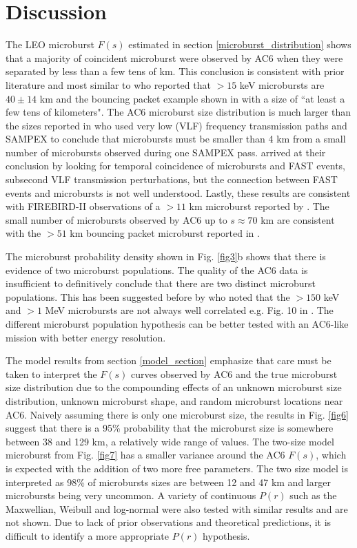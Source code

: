 \documentclass[draft]{agujournal2019}
\begin{document}
\section{Discussion}
The LEO microburst $F(s)$ estimated in section \ref{microburst_distribution} shows that a majority of coincident microburst were observed by AC6 when they were separated by less than a few tens of km. This conclusion is consistent with prior literature and most similar to  who reported that $> 15$ keV microbursts are $40 \pm 14$ km and the bouncing packet example shown in  with a size of ``at least a few tens of kilometers". The AC6 microburst size distribution is much larger than the sizes reported in  who used very low (VLF) frequency transmission paths and SAMPEX to conclude that microbursts must be smaller than 4 km from a small number of microbursts observed during one SAMPEX pass.  arrived at their conclusion by looking for temporal coincidence of microbursts and FAST events, subsecond VLF transmission perturbations, but the connection between FAST events and microbursts is not well understood. Lastly, these results are consistent with FIREBIRD-II observations of a $> 11$ km microburst reported by . The small number of microbursts observed by AC6 up to $s \approx 70$ km are consistent with the $> 51$ km bouncing packet microburst reported in . 

The microburst probability density shown in Fig. \ref{fig3}b shows that there is evidence of two microburst populations. The quality of the AC6 data is insufficient to definitively conclude that there are two distinct microburst populations. This has been suggested before by  who noted that the $> 150$ keV and $> 1$ MeV microbursts are not always well correlated e.g. Fig. 10 in . The different microburst population hypothesis can be better tested with an AC6-like mission with better energy resolution.

The model results from section \ref{model_section} emphasize that care must be taken to interpret the $F(s)$ curves observed by AC6 and the true microburst size distribution due to the compounding effects of an unknown microburst size distribution, unknown microburst shape, and random microburst locations near AC6. Naively assuming there is only one microburst size, the results in Fig. \ref{fig6} suggest that there is a 95\% probability that the microburst size is somewhere between 38 and 129 km, a relatively wide range of values. The two-size model microburst from Fig. \ref{fig7} has a smaller variance around the AC6 $F(s)$, which is expected with the addition of two more free parameters. The two size model is interpreted as 98\% of microbursts sizes are between 12 and 47 km and larger microbursts being very uncommon. A variety of continuous $P(r)$ such as the Maxwellian, Weibull and log-normal were also tested with similar results and are not shown. Due to lack of prior observations and theoretical predictions, it is difficult to identify a more appropriate $P(r)$ hypothesis.
\end{document}
